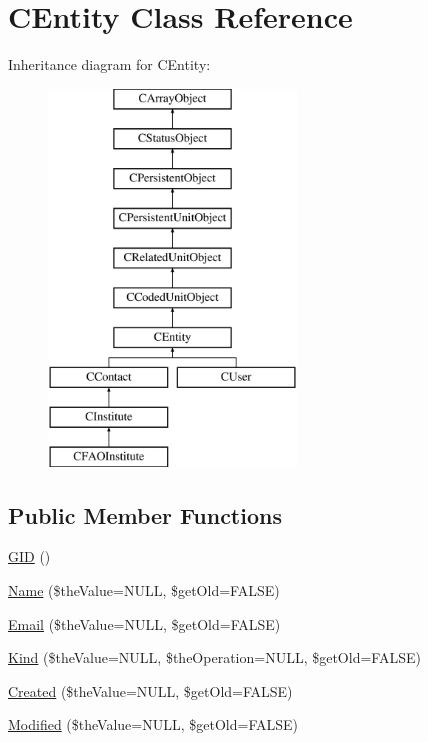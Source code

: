 \hypertarget{class_c_entity}{\section{C\-Entity Class Reference}
\label{class_c_entity}
}
Inheritance diagram for C\-Entity\-:\begin{figure}[H]
\begin{center}
\leavevmode
\includegraphics[height=10.000000cm]{class_c_entity}
\end{center}
\end{figure}
\subsection*{Public Member Functions}
\begin{DoxyCompactItemize}
\item 
\hyperlink{class_c_entity_a92cac9118e8d52f5f659dead5fc652a2}{G\-I\-D} ()
\item 
\hyperlink{class_c_entity_ace5878c009baf09d85c8ca115c48dbb0}{Name} (\$the\-Value=N\-U\-L\-L, \$get\-Old=F\-A\-L\-S\-E)
\item 
\hyperlink{class_c_entity_acf65b6fb2f4195f6c649b4ca506c7899}{Email} (\$the\-Value=N\-U\-L\-L, \$get\-Old=F\-A\-L\-S\-E)
\item 
\hyperlink{class_c_entity_ab64ce6f953237efc2bb10cfe97850f9a}{Kind} (\$the\-Value=N\-U\-L\-L, \$the\-Operation=N\-U\-L\-L, \$get\-Old=F\-A\-L\-S\-E)
\item 
\hyperlink{class_c_entity_a3795e2de9a84540ee558182e625200cf}{Created} (\$the\-Value=N\-U\-L\-L, \$get\-Old=F\-A\-L\-S\-E)
\item 
\hyperlink{class_c_entity_ab73a3f9b4012eaeb89efda393735512d}{Modified} (\$the\-Value=N\-U\-L\-L, \$get\-Old=F\-A\-L\-S\-E)
\end{DoxyCompactItemize}
